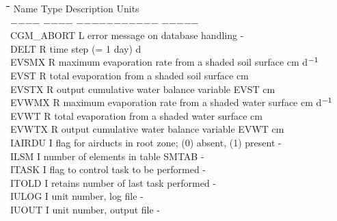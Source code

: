 \begin{tabbing}
\hspace{1.27cm}\=\hspace{1.27cm}\=\hspace{1.27cm}\=\hspace{1.27cm}\=%
\hspace{1.27cm}\=\hspace{1.27cm}\=\hspace{1.27cm}\=\hspace{1.27cm}\=%
\hspace{1.27cm}\=\hspace{1.27cm}\=\kill
Name    \> \> Type   \> Description                                        \> \> \> \> \> \> \> Units\\
$-$$-$$-$$-$    \> \> $-$$-$$-$$-$   \> $-$$-$$-$$-$$-$$-$$-$$-$$-$$-$$-$                                        \> \> \> \> \> \> \> $-$$-$$-$$-$$-$\\
CGM\_ABORT\> \> L\> error message on database handling\> \> \> \> \> \> \> -\\
DELT\> \> R\> time step (= 1 day)\> \> \> \> \> \> \> d\\
EVSMX\> \> R\> maximum evaporation rate from a shaded soil surface\> \> \> \> \> \> \> cm d$^{{\rm -1}}$\\
EVST\> \> R\> total evaporation from a shaded soil surface\> \> \> \> \> \> \> cm\\
EVSTX\> \> R\> output cumulative water balance variable EVST\> \> \> \> \> \> \> cm\\
EVWMX\> \> R\> maximum evaporation rate from a shaded water surface\> \> \> \> \> \> \> cm d$^{{\rm -1}}$\\
EVWT\> \> R\> total evaporation from a shaded water surface\> \> \> \> \> \> \> cm\\
EVWTX\> \> R\> output cumulative water balance variable EVWT\> \> \> \> \> \> \> cm\\
IAIRDU\> \> I\> flag for airducts in root zone; (0) absent, (1) present\> \> \> \> \> \> \> -\\
ILSM\> \> I\> number of elements in table SMTAB\> \> \> \> \> \> \> -\\
ITASK\> \> I\> flag to control task to be performed\> \> \> \> \> \> \> -\\
ITOLD\> \> I\> retains number of last task performed\> \> \> \> \> \> \> -\\
IULOG\> \> I\> unit number, log file\> \> \> \> \> \> \> -\\
IUOUT\> \> I\> unit number, output file\> \> \> \> \> \> \> -\\

\end{tabbing}
